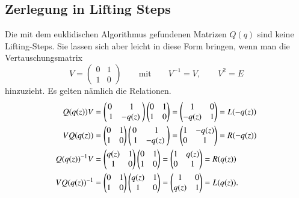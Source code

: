 \subsection{Zerlegung in Lifting Steps}
Die mit dem euklidischen Algorithmus gefundenen Matrizen $Q(q)$ sind
keine Lifting-Steps.
Sie lassen sich aber leicht in diese Form bringen, wenn man die
Vertauschungsmatrix 
\[
V
=
\begin{pmatrix}0&1\\1&0\end{pmatrix}
\qquad\text{mit}\qquad
V^{-1} = V, \qquad V^2=E
\]
hinzuzieht.
Es gelten nämlich die Relationen.
\begin{align}
Q(q(z))V 
&=
\begin{pmatrix} 0 & 1 \\ 1 & -q(z) \end{pmatrix}
\begin{pmatrix}0&1\\1&0\end{pmatrix}
=
\begin{pmatrix} 1 & 0 \\ -q(z) & 1 \end{pmatrix}
=
L(-q(z))
\notag
\\
VQ(q(z))
&=
\begin{pmatrix}0&1\\1&0\end{pmatrix}
\begin{pmatrix} 0 & 1 \\ 1 & -q(z) \end{pmatrix}
=
\begin{pmatrix} 1 & -q(z) \\ 0 & 1 \end{pmatrix}
=
R(-q(z))
\notag
\\
Q(q(z))^{-1}V
&=
\begin{pmatrix} q(z) & 1 \\ 1 & 0 \end{pmatrix}
\begin{pmatrix}0&1\\1&0\end{pmatrix}
=
\begin{pmatrix} 1 & q(z) \\ 0 & 1 \end{pmatrix}
=
R(q(z))
\label{lifting:step:qvr}
\\
VQ(q(z))^{-1}
&=
\begin{pmatrix}0&1\\1&0\end{pmatrix}
\begin{pmatrix} q(z) & 1 \\ 1 & 0 \end{pmatrix}
=
\begin{pmatrix} 1 & 0 \\ q(z) & 1 \end{pmatrix}
=
L(q(z)).
\label{lifting:step:vql}
\end{align}

